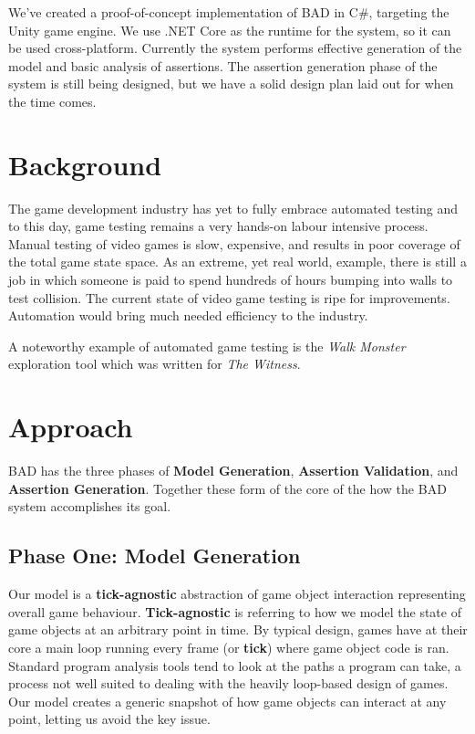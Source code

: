 \documentclass[letterpaper,twocolumn,10pt]{article}
\begin{document}
We've created a proof-of-concept implementation of BAD in C\#, targeting the Unity game engine. We use .NET Core as the runtime for the system, so it can be used cross-platform. Currently the system performs effective generation of the model and basic analysis of assertions. The assertion generation phase of the system is still being designed, but we have a solid design plan laid out for when the time comes.

\section{Background}

The game development industry has yet to fully embrace automated testing and to this day, game testing remains a very hands-on labour intensive process. Manual testing of video games is slow, expensive, and results in poor coverage of the total game state space. As an extreme, yet real world, example, there is still a job in which someone is paid to spend hundreds of hours bumping into walls to test collision. The current state of video game testing is ripe for improvements. Automation would bring much needed efficiency to the industry.

A noteworthy example of automated game testing is the \textit{Walk Monster}~\cite{WalkMonster} exploration tool which was written for \textit{The Witness}. 

\section{Approach}

BAD has the three phases of \textbf{Model Generation}, \textbf{Assertion Validation}, and \textbf{Assertion Generation}. Together these form of the core of the how the BAD system accomplishes its goal. 

\subsection{Phase One: Model Generation}

Our model is a \textbf{tick-agnostic} abstraction of game object interaction representing overall game behaviour. \textbf{Tick-agnostic} is referring to how we model the state of game objects at an arbitrary point in time. By typical design, games have at their core a main loop running every frame (or \textbf{tick}) where game object code is ran. Standard program analysis tools tend to look at the paths a program can take, a process not well suited to dealing with the heavily loop-based design of games. Our model creates a generic snapshot of how game objects can interact at any point, letting us avoid the key issue.
\end{document}
